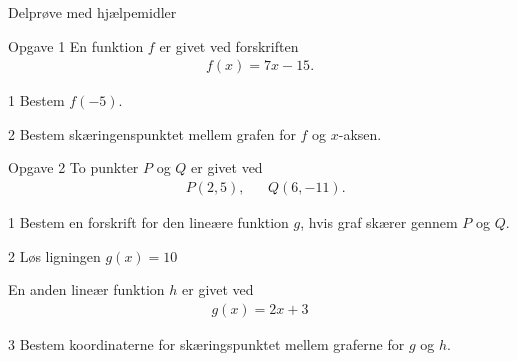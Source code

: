 

\begin{center}
\LARGE
Delprøve med hjælpemidler 
\end{center}
\begin{opgavetekst}{Opgave 1}
	En funktion $f$ er givet ved forskriften
	\begin{align*}
		f(x) = 7x-15.
	\end{align*}
\end{opgavetekst}
\begin{delopgave}{}{1}
	Bestem $f(-5)$.
\end{delopgave}
\begin{delopgave}{}{2}
	Bestem skæringenspunktet mellem grafen for $f$ og $x$-aksen. 
\end{delopgave}
\begin{opgavetekst}{Opgave 2}
	To punkter $P$ og $Q$ er givet ved
	\begin{align*}
		&P(2,5), &&Q(6,-11).
	\end{align*}
\end{opgavetekst}
\begin{delopgave}{}{1}
	Bestem en forskrift for den lineære funktion $g$, hvis graf skærer gennem $P$ og $Q$. 
\end{delopgave}
\begin{delopgave}{}{2}
	Løs ligningen $g(x) = 10$
\end{delopgave}
\begin{meretekst}
	En anden lineær funktion $h$ er givet ved
	\begin{align*}
		g(x) = 2x+3
	\end{align*}
\end{meretekst}
\begin{delopgave}{}{3}
	Bestem koordinaterne for skæringspunktet mellem graferne for $g$ og $h$. 
\end{delopgave}
